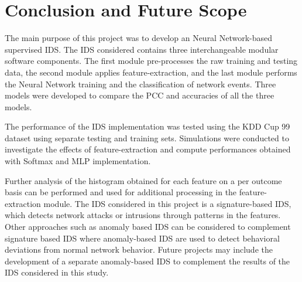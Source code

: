 \documentclass[12pt]{article}
\theoremstyle{definition}
\begin{document}

	\cleardoublepage
	\section{Conclusion and Future Scope}
	The main purpose of this project was to develop an Neural Network-based supervised IDS. The IDS considered contains three interchangeable modular software components. The first
	module pre-processes the raw training and testing data, the second module applies feature-extraction, and the last module performs the Neural Network training and the classification of
	network events. Three models were developed to compare the PCC and accuracies of all the three models.
	
	The performance of the IDS implementation was tested using the KDD Cup 99 dataset using separate testing and training sets. Simulations were conducted to investigate the effects of feature-extraction and compute performances obtained with Softmax and MLP implementation.
	
	Further analysis of the histogram obtained for each feature on a per outcome basis can be performed and used for additional processing in the feature-extraction module.
	The IDS considered in this project is a signature-based IDS, which detects network attacks or intrusions through patterns in the features. Other approaches such as anomaly based IDS can be considered to complement signature based IDS where anomaly-based IDS are used to detect behavioral deviations from normal network behavior. Future projects may include the development of a separate anomaly-based IDS to complement the results of the IDS considered in this study.
	
	
	\cleardoublepage
	
	
		
	
	
	
	
	
	
	
	
	
	
	
	
	
	
	
	
	
	
	
	
	
\end{document}
